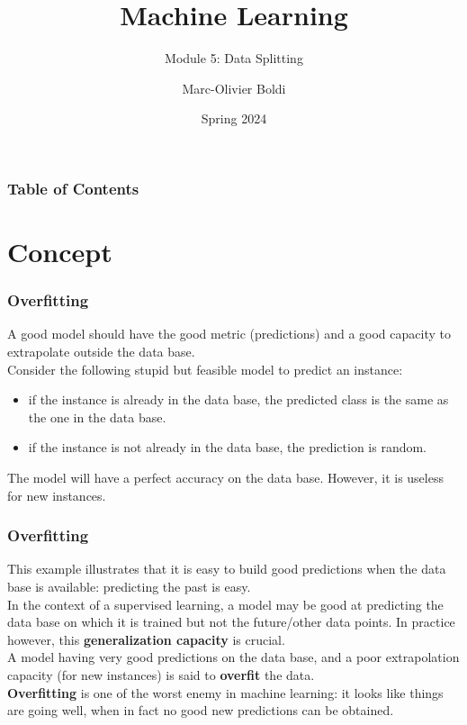 
\title{Machine Learning}
\subtitle{Module 5: Data Splitting}
\author[MOB]{Marc-Olivier Boldi}
\date[Spring 2024]{Spring 2024}

\begin{frame}
  \titlepage
\end{frame}
\begin{frame}
\frametitle{Table of Contents}
	\tableofcontents
\end{frame}
\section{Concept}
\begin{frame}
\frametitle{Overfitting}
A good model should have the good metric (predictions) and a good capacity to extrapolate outside the data base. \\
\vspace{0.3cm}
Consider the following stupid but feasible model to predict an instance:
\begin{itemize}
\item if the instance is already in the data base, the predicted class is the same as the one in the data base.
\item if the instance is not already in the data base, the prediction is random.
\end{itemize}
The model will have a perfect accuracy on the data base. However, it is useless for new instances.
\end{frame}
\begin{frame}
\frametitle{Overfitting}
This example illustrates that it is easy to build good predictions when the data base is available: predicting the past is easy.\\
\vspace{0.3cm}
In the context of a supervised learning, a model may be good at predicting the data base on which it is trained but not the future/other data points. In practice however, this {\bf generalization capacity} is crucial.\\
\vspace{0.2cm}
A model having very good predictions on the data base, and a poor extrapolation capacity (for new instances) is said to {\bf overfit} the data.\\
\vspace{0.2cm}
{\bf Overfitting} is one of the worst enemy in machine learning: it looks like things are going well, when in fact no good new predictions can be obtained.
\end{frame}
